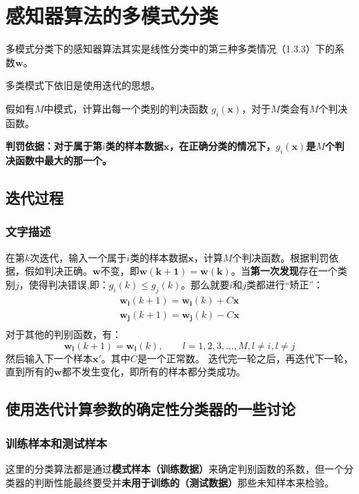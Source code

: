 \documentclass[12pt, letterpaper]{article}
\begin{document}
\section{感知器算法的多模式分类}
多模式分类下的感知器算法其实是线性分类中的第三种多类情况（1.3.3）下的系数$\mathbf{w}$。

多类模式下依旧是使用迭代的思想。

假如有$M$中模式，计算出每一个类别的判决函数
$g_i(\mathbf{x})$，对于$M$类会有$M$个判决函数。

\textbf{判罚依据：对于属于第$i$类的样本数据$\mathbf{x}$，在正确分类的情况下，$g_i(\mathbf{x})$是$M$个判决函数中最大的那一个。}



\subsection{迭代过程}

\subsubsection*{文字描述}
在第$k$次迭代，输入一个属于$i$类的样本数据$\mathbf{x}$，计算$M$个判决函数。根据判罚依据，假如判决正确。$\mathbf{w}$不变，即$\mathbf{w(k+1)=w(k)}$。当\textbf{第一次发现}存在一个类别$j$，使得判决错误,即：$g_i(k)\leq g_j(k)$。那么就要$i$和$j$类都进行“矫正”：
\begin{equation}
\begin{aligned}
\mathbf{w_i}(k+1)=\mathbf{w_i}(k)+C\mathbf{x}\\
\mathbf{w_j}(k+1)=\mathbf{w_j}(k)-C\mathbf{x}\\
\end{aligned}
\end{equation}
对于其他的判别函数，有：
$$\mathbf{w_l}(k+1)=\mathbf{w_l}(k),\qquad l=1,2,3,\ldots,M,l\neq i,l\neq j$$
然后输入下一个样本$\mathbf{x'}$。其中$C$是一个正常数。
迭代完一轮之后，再迭代下一轮，直到所有的$\mathbf{w}$都不发生变化，即所有的样本都分类成功。

\subsection{使用迭代计算参数的确定性分类器的一些讨论}
\subsubsection*{训练样本和测试样本}
这里的分类算法都是通过\textbf{模式样本（训练数据）}来确定判别函数的系数，但一个分类器的判断性能最终要受并\textbf{未用于训练的（测试数据）}那些未知样本来检验。
\end{document}

